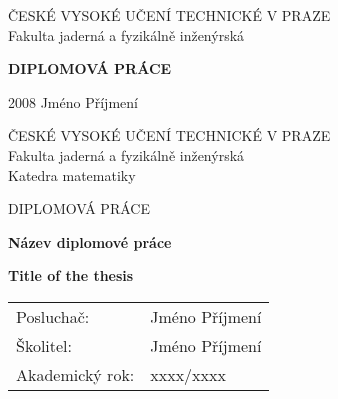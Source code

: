 
\thispagestyle{empty}

\begin{center}

{\Large ČESKÉ VYSOKÉ UČENÍ TECHNICKÉ V PRAZE} \\[3.5mm]
{\Large Fakulta jaderná a fyzikálně inženýrská}


{\Huge\textbf{DIPLOMOVÁ PRÁCE}}


{\Large \hspace*{1cm} 2008 \hfill Jméno Příjmení \hspace*{1cm}}

\end{center}


\newpage

\thispagestyle{empty}

\begin{center}

{\Large ČESKÉ VYSOKÉ UČENÍ TECHNICKÉ V PRAZE} \\[3.5mm]
{\Large Fakulta jaderná a fyzikálně inženýrská} \\[3.5mm]
{\Large Katedra matematiky}


{\Large DIPLOMOVÁ PRÁCE}


{\LARGE
\textbf{Název diplomové práce}
\par}

\vspace{1cm}

{\LARGE
\textbf{Title of the thesis}
\par}


\end{center}

\begin{tabular}{ll} 
{\Large Posluchač:} & {\Large Jméno Příjmení} \\[1mm]
{\Large \v{S}kolitel:} & {\Large Jméno Příjmení} \\[2mm]
{\Large Akademický rok:}     & {\Large xxxx/xxxx}
\end{tabular}

